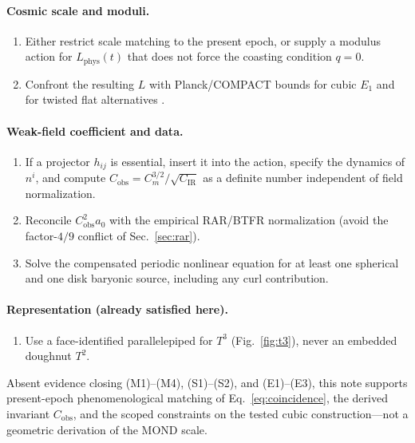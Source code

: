 \documentclass[aps,prd,reprint,superscriptaddress,nofootinbib,floatfix,showkeys]{revtex4-2}
\newcommand{\Tthree}{T^{3}}
\newcommand{\Ttwo}{T^{2}}
\newcommand{\Cobs}{C_{\mathrm{obs}}}
\newcommand{\Cm}{C_{m}}
\newcommand{\CIR}{C_{\mathrm{IR}}}
\newcommand{\azero}{a_{0}}
\begin{document}
\paragraph{Cosmic scale and moduli.}
\begin{enumerate}
\item[(S1)] Either restrict scale matching to the present epoch, or supply a
  modulus action for \(L_{\mathrm{phys}}(t)\) that does not force the
  coasting condition \(q=0\).
\item[(S2)] Confront the resulting \(L\) with Planck/COMPACT bounds for cubic
  \(E_1\) and for twisted flat alternatives \cite{planck_topology,compact_promise}.
\end{enumerate}

\paragraph{Weak-field coefficient and data.}
\begin{enumerate}
\item[(E1)] If a projector \(h_{ij}\) is essential, insert it into the action,
  specify the dynamics of \(n^{i}\), and compute
  \(\Cobs=\Cm^{3/2}/\sqrt{\CIR}\)
  as a definite number independent of field normalization.
\item[(E2)] Reconcile \(\Cobs^{2}\azero\) with the empirical RAR/BTFR
  normalization (avoid the factor-\(4/9\) conflict of Sec.~\ref{sec:rar}).
\item[(E3)] Solve the compensated periodic nonlinear equation for at least one
  spherical and one disk baryonic source, including any curl contribution.
\end{enumerate}

\paragraph{Representation (already satisfied here).}
\begin{enumerate}
\item[(R1)] Use a face-identified parallelepiped for \(\Tthree\)
  (Fig.~\ref{fig:t3}), never an embedded doughnut \(\Ttwo\).
\end{enumerate}

Absent evidence closing (M1)--(M4), (S1)--(S2), and (E1)--(E3), this note
supports present-epoch phenomenological matching of
Eq.~\eqref{eq:coincidence}, the derived invariant \(\Cobs\), and the scoped
constraints on the tested cubic construction---not a geometric derivation of
the MOND scale.
\end{document}
